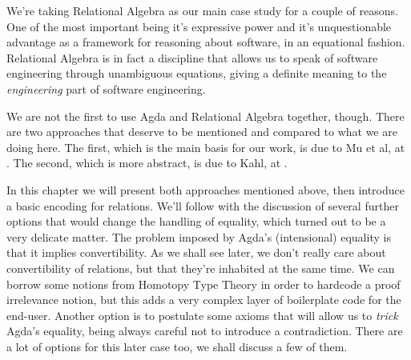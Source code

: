 We're taking Relational Algebra\cite{Bird97} as our main case study for a couple of reasons. One of the most
important being it's expressive power and it's unquestionable advantage as a framework for
reasoning about software, in an equational fashion. Relational Algebra is in fact a discipline that
allows us to speak of software engineering through unambiguous equations, giving a definite meaning
to the \emph{engineering} part of software engineering.

We are not the first to use Agda and Relational Algebra together, though. There are two approaches
that deserve to be mentioned and compared to what we are doing here. The first, which is the main
basis for our work, is due to Mu et al, at \cite{Jansson09}. The second, which is more abstract,
is due to Kahl, at \cite{RATHAgda}.

In this chapter we will present both approaches mentioned above, 
then introduce a basic encoding for relations. We'll follow with the discussion of several 
further options that would change the handling of equality, which turned out to be a very
delicate matter. The problem imposed by Agda's (intensional) equality is that it implies
convertibility. As we shall see later, we don't really care about convertibility of relations,
but that they're inhabited at the same time. We can borrow some notions from Homotopy Type Theory\cite{hottbook}
in order to hardcode a proof irrelevance notion, but this adds a very complex layer of boilerplate
code for the end-user. Another option is to postulate some axioms that will allow us to \emph{trick}
Agda's equality, being always careful not to introduce a contradiction. 
There are a lot of options for this later case too, we shall discuss a few of them.
